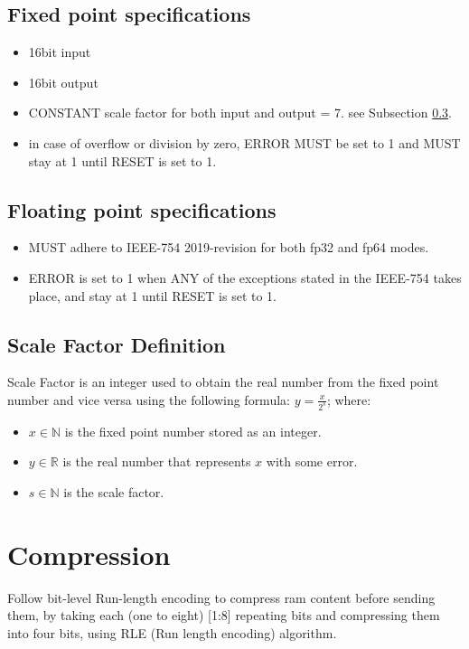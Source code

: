 \documentclass[12pt]{report}
\begin{document}
\subsection{Fixed point specifications}
\begin{itemize}
    \item 16bit input
    \item 16bit output
    \item CONSTANT scale factor for both input and output = 7. see Subsection \ref{sec:fpu:scale}.
    \item in case of overflow or division by zero, ERROR MUST be set to 1 and MUST stay at 1 until RESET is set to 1.
\end{itemize}

\subsection{Floating point specifications}
\begin{itemize}
    \item MUST adhere to IEEE-754 2019-revision \cite{ieee754} for both fp32 and fp64 modes.
    \item ERROR is set to 1 when ANY of the exceptions stated in the IEEE-754 takes place, and stay at 1 until RESET is set to 1.
\end{itemize}

\subsection{Scale Factor Definition}
\label{sec:fpu:scale}
Scale Factor is an integer used to obtain the real number from the fixed point number and vice versa using the following formula: 
$y = \frac{x}{2^s}$; where: 
\begin{itemize}
    \item $x \in \mathbb{N}$ is the fixed point number stored as an integer.
    \item $y \in \mathbb{R}$ is the real number that represents $x$ with some error.
    \item $s \in \mathbb{N}$ is the scale factor.
\end{itemize}

\section{Compression}
Follow bit-level Run-length encoding to compress ram content before sending them, by taking each (one to eight) [1:8] repeating bits and compressing them into four bits, using RLE (Run length encoding) algorithm.
\end{document}
